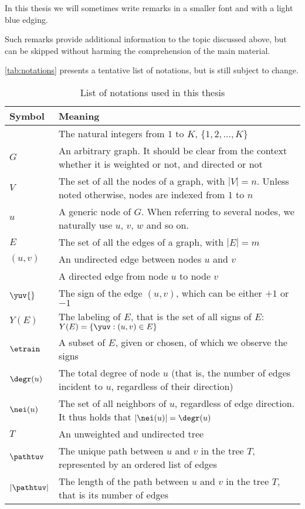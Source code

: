 In this thesis we will sometimes write remarks in a smaller font and with a light blue edging.
\begin{aside}
  Such remarks provide additional information to the topic discussed above, but can be skipped
  without harming the comprehension of the main material.
\end{aside}

\autoref{tab:notations} presents a tentative list of notations, but is still subject to change.

\begin{table*}[thpb]
\begin{adjustwidth}{-2cm}{}
  \centering
  \caption{List of notations used in this thesis}\label{tab:notations}%
  \vspace{-.5\baselineskip}
  \begin{tabulary}{179mm}{LL}
    \toprule
    Symbol & Meaning \\
    \midrule
    \rangek{} & The natural integers from $1$ to $K$, \ie{} $\{1, 2, \ldots, K \}$ \\
    $G$ & An arbitrary graph. It should be clear from the context whether it is weighted or not, and directed or not \\
    $V$ & The set of all the nodes of a graph, with $|V|=n$. Unless noted otherwise, nodes are indexed from $1$ to $n$ \\
    $u$ & A generic node of $G$. When referring to several nodes, we naturally use $u$, $v$, $w$ and so on. \\
    $E$ & The set of all the edges of a graph, with $|E|=m$ \\
    $(u,v)$ & An undirected edge between nodes $u$ and $v$ \\
    \euv{} & A directed edge from node $u$ to node $v$ \\
    $\yuv{}$ & The sign of the edge $(u,v)$, which can be either $+1$ or $-1$ \\
    $Y(E)$ & The labeling of $E$, that is the set of all signs of $E$: $Y(E) = \{\yuv : (u,v)\in E\}$ \\
    $\etrain$ & A subset of $E$, given or chosen, of which we observe the signs \\
    $\degr(u)$ & The total degree of node $u$ (that is, the number of edges incident to $u$,
    regardless of their direction) \\
    $\nei(u)$ & The set of all neighbors of $u$, regardless of edge direction. It thus holds
    that $|\nei(u)| = \degr(u)$ \\
    $T$ & An unweighted and undirected tree \\
    $\pathtuv$ & The unique path between $u$ and $v$ in the tree $T$, represented by an ordered list of edges \\
    $|\pathtuv|$ & The length of the path between $u$ and $v$ in the tree $T$, that is its number of edges \\
    \bottomrule
  \end{tabulary}
\end{adjustwidth}
\end{table*}
